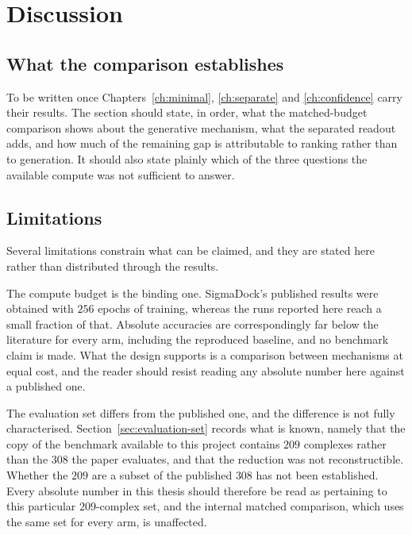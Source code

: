 \documentclass[11pt,a4paper]{report}
\theoremstyle{plain}
\theoremstyle{definition}
\theoremstyle{remark}
\newenvironment{reserved}[1]{%
    \begin{tcolorbox}[
      enhanced, breakable,
      colback=PanelGrey, colframe=DraftBlue,
      boxrule=0.5pt, left=6pt,right=6pt,top=5pt,bottom=5pt,
      fonttitle=\bfseries\small\sffamily,
      title={RESERVED \textendash\ #1}]
      \small\sffamily
  }{%
    \end{tcolorbox}
  }
\newenvironment{reserved}[1]{\setbox0=\vbox\bgroup}{\egroup}
\begin{document}
\chapter{Discussion}
\label{ch:discussion}

\section{What the comparison establishes}

\begin{reserved}{Synthesis across the three variants}
To be written once Chapters~\ref{ch:minimal}, \ref{ch:separate} and
\ref{ch:confidence} carry their results. The section should state, in order,
what the matched-budget comparison shows about the generative mechanism, what
the separated readout adds, and how much of the remaining gap is attributable
to ranking rather than to generation. It should also state plainly which of the
three questions the available compute was not sufficient to answer.
\end{reserved}

\section{Limitations}

Several limitations constrain what can be claimed, and they are stated here
rather than distributed through the results.

The compute budget is the binding one. SigmaDock's published results were
obtained with $256$ epochs of training, whereas the runs reported here reach a
small fraction of that. Absolute accuracies are correspondingly far below the
literature for every arm, including the reproduced baseline, and no benchmark
claim is made. What the design supports is a comparison between mechanisms at
equal cost, and the reader should resist reading any absolute number here
against a published one.

The evaluation set differs from the published one, and the difference is not
fully characterised. Section~\ref{sec:evaluation-set} records what is known,
namely that the copy of the benchmark available to this project contains $209$
complexes rather than the $308$ the paper evaluates, and that the reduction was
not reconstructible. Whether the $209$ are a subset of the published $308$ has
not been established. Every absolute number in this thesis should therefore be
read as pertaining to this particular $209$-complex set, and the internal
matched comparison, which uses the same set for every arm, is unaffected.
\end{document}
